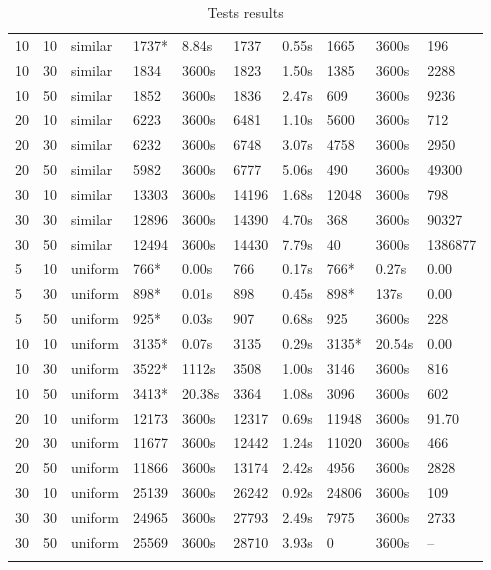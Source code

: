 \begin{scriptsize}
\begin{longtable}{@{\extracolsep{\fill}}l|l|l|ll|ll|lll@{}}
 10 & 10 & similar& 1737*& 8.84s& 1737& 0.55s & 1665& 3600s& 196 \\
 10 & 30 & similar& 1834& 3600s& 1823& 1.50s & 1385& 3600s& 2288 \\
 10 & 50 & similar& 1852& 3600s& 1836& 2.47s & 609& 3600s& 9236 \\
 20 & 10 & similar& 6223& 3600s& 6481& 1.10s & 5600& 3600s& 712 \\
 20 & 30 & similar& 6232& 3600s& 6748& 3.07s & 4758& 3600s& 2950 \\
 20 & 50 & similar& 5982& 3600s& 6777& 5.06s & 490& 3600s& 49300 \\
 30 & 10 & similar& 13303& 3600s& 14196& 1.68s & 12048& 3600s& 798 \\
 30 & 30 & similar& 12896& 3600s& 14390& 4.70s & 368& 3600s& 90327 \\
 30 & 50 & similar& 12494& 3600s& 14430& 7.79s & 40& 3600s& 1386877 \\
 5 & 10 & uniform& 766*& 0.00s& 766& 0.17s & 766*& 0.27s & 0.00 \\
 5 & 30 & uniform& 898*& 0.01s& 898& 0.45s & 898*& 137s & 0.00 \\
 5 & 50 & uniform& 925*& 0.03s& 907& 0.68s & 925& 3600s& 228 \\
 10 & 10 & uniform& 3135*& 0.07s& 3135& 0.29s & 3135*& 20.54s & 0.00 \\
 10 & 30 & uniform& 3522*& 1112s & 3508& 1.00s & 3146& 3600s& 816 \\
 10 & 50 & uniform& 3413*& 20.38s& 3364& 1.08s & 3096& 3600s& 602 \\
 20 & 10 & uniform& 12173& 3600s& 12317& 0.69s & 11948& 3600s& 91.70 \\
 20 & 30 & uniform& 11677& 3600s& 12442& 1.24s & 11020& 3600s& 466 \\
 20 & 50 & uniform& 11866& 3600s& 13174& 2.42s & 4956& 3600s& 2828 \\
 30 & 10 & uniform& 25139& 3600s& 26242& 0.92s & 24806& 3600s& 109 \\
 30 & 30 & uniform& 24965& 3600s& 27793& 2.49s & 7975& 3600s& 2733 \\
 30 & 50 & uniform& 25569& 3600s& 28710& 3.93s & 0& 3600s& -- \\
\hline 
\caption{Tests results}\\ 
\end{longtable}
\end{scriptsize}
